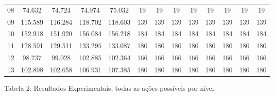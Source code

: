 \documentclass[12pt,a4paper]{article}
\begin{document}
\begin{adjustbox}{width={\textwidth}, totalheight={\textheight}, keepaspectratio}
\begin{tabular}{l cccc cccc cccc}
            08    & 74.632                                     & 74.724                          & 74.974                             & 75.032     & 19  & 19   & 19  & 19         & 19  & 19   & 19  & 19         \\
            09    & 115.589                                    & 116.284                         & 118.702                            & 118.603    & 139 & 139  & 139 & 139        & 139 & 139  & 139 & 139        \\
            10    & 152.918                                    & 151.920                         & 156.084                            & 156.218    & 184 & 184  & 184 & 184        & 184 & 184  & 184 & 184        \\
            11    & 128.591                                    & 129.511                         & 133.295                            & 133.087    & 180 & 180  & 180 & 180        & 180 & 180  & 180 & 180        \\
            12    & 98.737                                     & 99.028                          & 102.885                            & 102.364    & 166 & 166  & 166 & 166        & 166 & 166  & 166 & 166        \\
            13    & 102.898                                    & 102.658                         & 106.931                            & 107.385    & 180 & 180  & 180 & 180        & 180 & 180  & 180 & 180        \\
            \bottomrule
      \end{tabular}
\end{adjustbox}

\vspace*{0.5cm}

\centering
Tabela 2: Resultados Experimentais, todas as ações possíveis por nível.
\end{document}
